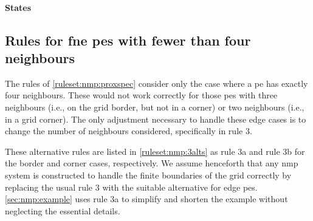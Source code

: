 \paragraph{States}
\begin{description}
\end{description}

\subsection{\label{sec:nmp:ruleslessthanfour}Rules for \texorpdfstring{\acrlong{fne}}{four-neighbourhood} \texorpdfstring{\acrshort{pe}s}{proxels} with fewer than four neighbours}

The rules of \autoref{ruleset:nmp:proxspec} consider only the case where a \gls{pe} has exactly four neighbours.  These would not work correctly for those \glspl{pe} with three neighbours (i.e., on the grid border, but not in a corner) or two neighbours (i.e., in a grid corner).  The only adjustment necessary to handle these edge cases is to change the number of neighbours considered, specifically in rule 3.

These alternative rules are listed in \autoref{ruleset:nmp:3alts} as rule 3a and rule 3b for the border and corner cases, respectively.  We assume henceforth that any \gls{nmp} system is constructed to handle the finite boundaries of the grid correctly by replacing the usual rule 3 with the suitable alternative for edge \glspl{pe}.  \autoref{sec:nmp:example} uses rule 3a to simplify and shorten the example without neglecting the essential details.


